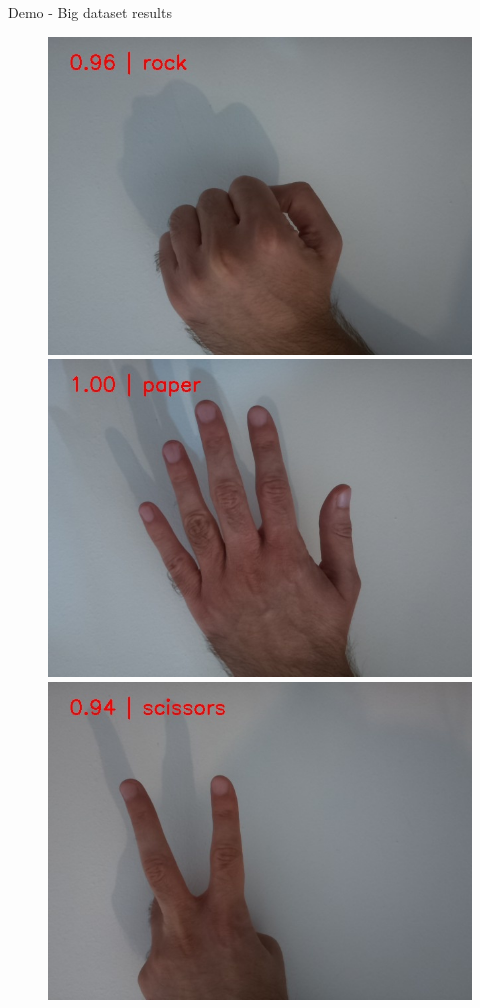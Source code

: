 \begin{frame}{Demo - Big dataset results}
  \begin{figure}
	\includegraphics[width=0.33\linewidth,height=0.5\textheight,keepaspectratio]{images/rock_output.jpeg}%
	\includegraphics[width=0.33\linewidth,height=0.5\textheight,keepaspectratio]{images/paper_output.jpeg}%
	\includegraphics[width=0.33\linewidth,height=0.5\textheight,keepaspectratio]{images/scissors_output.jpeg}
  \end{figure}
\end{frame}


